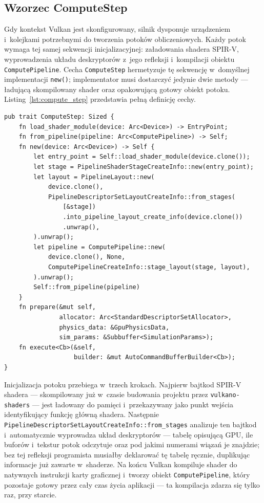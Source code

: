 \subsection{Wzorzec ComputeStep}
\label{subsec:compute_step}

Gdy kontekst Vulkan jest skonfigurowany, silnik dysponuje urządzeniem
i~kolejkami potrzebnymi do tworzenia potoków obliczeniowych. Każdy
potok wymaga tej samej sekwencji inicjalizacyjnej: załadowania shadera
SPIR-V, wyprowadzenia układu deskryptorów z~jego refleksji i~kompilacji
obiektu \texttt{ComputePipeline}. Cecha \texttt{ComputeStep} hermetyzuje
tę sekwencję w~domyślnej implementacji \texttt{new()}; implementator
musi dostarczyć jedynie dwie metody --- ładującą skompilowany shader
oraz opakowującą gotowy obiekt potoku.
Listing~\ref{lst:compute_step} przedstawia pełną definicję cechy.

\begin{lstlisting}[caption={Cecha \texttt{ComputeStep}},
                   label=lst:compute_step]
pub trait ComputeStep: Sized {
    fn load_shader_module(device: Arc<Device>) -> EntryPoint;
    fn from_pipeline(pipeline: Arc<ComputePipeline>) -> Self;
    fn new(device: Arc<Device>) -> Self {
        let entry_point = Self::load_shader_module(device.clone());
        let stage = PipelineShaderStageCreateInfo::new(entry_point);
        let layout = PipelineLayout::new(
            device.clone(),
            PipelineDescriptorSetLayoutCreateInfo::from_stages(
                [&stage])
                .into_pipeline_layout_create_info(device.clone())
                .unwrap(),
        ).unwrap();
        let pipeline = ComputePipeline::new(
            device.clone(), None,
            ComputePipelineCreateInfo::stage_layout(stage, layout),
        ).unwrap();
        Self::from_pipeline(pipeline)
    }
    fn prepare(&mut self,
               allocator: Arc<StandardDescriptorSetAllocator>,
               physics_data: &GpuPhysicsData,
               sim_params: &Subbuffer<SimulationParams>);
    fn execute<Cb>(&self, 
                   builder: &mut AutoCommandBufferBuilder<Cb>);
}
\end{lstlisting}

Inicjalizacja potoku przebiega w~trzech krokach.
Najpierw bajtkod SPIR-V shadera --- skompilowany już w~czasie budowania
projektu przez \texttt{vulkano-shaders} --- jest ładowany do pamięci
i~przekazywany jako punkt wejścia identyfikujący funkcję główną shadera.
Następnie \texttt{PipelineDescriptorSetLayoutCreateInfo::from\_stages}
analizuje ten bajtkod i~automatycznie wyprowadza układ deskryptorów ---
tabelę opisującą GPU, ile buforów i~tekstur potok odczytuje oraz pod
jakimi numerami wiązań je znajdzie; bez tej refleksji programista
musiałby deklarować tę tabelę ręcznie, duplikując informacje już zawarte
w~shaderze.
Na końcu Vulkan kompiluje shader do natywnych instrukcji karty graficznej
i~tworzy obiekt \texttt{ComputePipeline}, który pozostaje gotowy przez
cały czas życia aplikacji --- ta kompilacja zdarza się tylko raz, przy
starcie.

